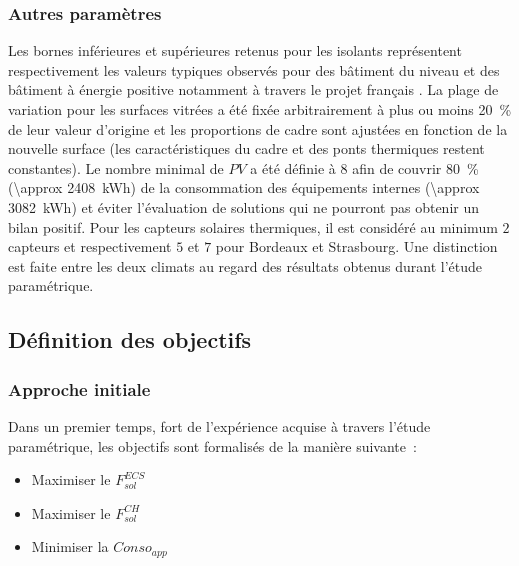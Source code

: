 \subsubsection{Autres paramètres} %
\label{ssub:autres_parametres}
Les bornes inférieures et supérieures retenus pour les isolants représentent respectivement les valeurs typiques observés
pour des bâtiment du niveau  et des bâtiment à énergie positive notamment à
travers le projet français .
La plage de variation pour les surfaces vitrées a été fixée arbitrairement à plus ou moins
\SI{20}{\percent} de leur valeur d’origine et les proportions de cadre sont ajustées
en fonction de la nouvelle surface (les caractéristiques du cadre et des ponts thermiques
restent constantes).
Le nombre minimal de $PV$ a été définie à $8$ afin de couvrir \SI{80}{\percent} (\SI{\approx
2408}{\kWh}) de la consommation des équipements internes (\SI{\approx 3082}{\kWh}) et éviter
l’évaluation de solutions qui ne pourront pas obtenir un bilan positif.
Pour les capteurs solaires thermiques, il est considéré au minimum $2$ capteurs et respectivement
$5$ et $7$ pour Bordeaux et Strasbourg. Une distinction est faite entre les deux climats
au regard des résultats obtenus durant l’étude paramétrique.



\subsection{Définition des objectifs} %
\label{sub:definition_des_objectifs}
\subsubsection{Approche initiale} %
\label{ssub:approche_initiale}
\noindent Dans un premier temps, fort de l’expérience acquise à travers l’étude paramétrique,
les objectifs sont formalisés de la manière suivante~:
\begin{itemize}
  \item Maximiser le $F_{sol}^{ECS}$
  \item Maximiser le $F_{sol}^{CH}$
  \item Minimiser la $Conso_{app}$
\end{itemize}


